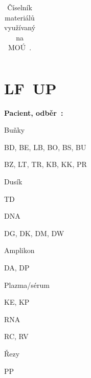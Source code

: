 \documentclass[11pt, final, oneside]{fithesis2}
\begin{document}
\begin{appendix}
\begin{table}[h!]
\begin{tabular}{l l l l l l}
\hline %
\end{tabular} 
\caption{Číselník materiálů využívaný na MOÚ~\cite{ARCH_2014_1_25}.}
\label{tab:ciselnik-mat-muni}
\end{table} 
\newpage

\section{LF~UP~}
\begin{multicols}{2}
\textbf{Pacient, odběr~\cite{ARCH_2014_1_25}:} 
\begin{compactitem}
	\item Buňky 
		\begin{compactitem}
			\item BD, BE, LB, BO, BS, BU
			\item BZ, LT, TR, KB, KK, PR
		\end{compactitem}

	\item Dusík 
		\begin{compactitem}
			\item TD
		\end{compactitem}

	\item DNA 
		\begin{compactitem}
			\item DG, DK, DM, DW
		\end{compactitem}

	\item Amplikon 
		\begin{compactitem}
			\item DA, DP
		\end{compactitem}
	
	\item Plazma/sérum 
		\begin{compactitem}
			\item KE, KP
		\end{compactitem}
	
	\item RNA 
		\begin{compactitem}
			\item RC, RV
		\end{compactitem}

	\item Řezy 
		\begin{compactitem}
			\item PP
		\end{compactitem}


\end{compactitem}
\end{multicols}
\end{appendix}
\end{document}
